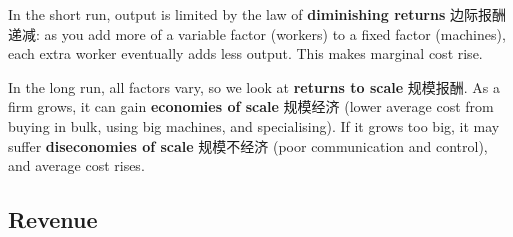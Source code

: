 \documentclass[11pt]{article}
\begin{document}
\begin{center}
\end{center}

In the short run, output is limited by the law of \textbf{diminishing returns} 边际报酬递减: as you add more of a variable factor (workers) to a fixed factor (machines), each extra worker eventually adds less output. This makes marginal cost rise.

In the long run, all factors vary, so we look at \textbf{returns to scale} 规模报酬. As a firm grows, it can gain \textbf{economies of scale} 规模经济 (lower average cost from buying in bulk, using big machines, and specialising). If it grows too big, it may suffer \textbf{diseconomies of scale} 规模不经济 (poor communication and control), and average cost rises.

\subsection*{Revenue}

\begin{center}
\end{center}
\end{document}
